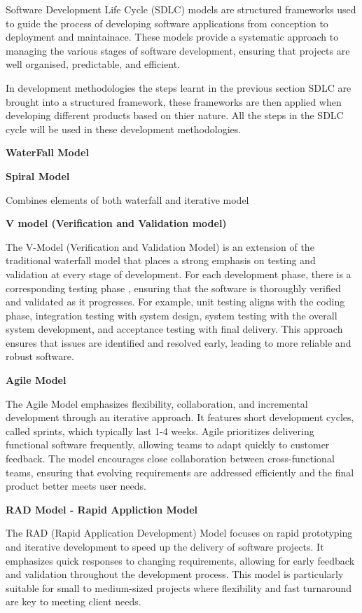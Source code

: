 \documentclass[a4paper]{article}
\begin{document}
Software Development Life Cycle (SDLC) models are structured frameworks used to guide the process of developing software applications from conception
to deployment and maintainace. These models provide a systematic approach to managing the various stages of software development, ensuring that 
projects are well organised, predictable, and efficient.

In development methodologies the steps learnt in the previous section SDLC are brought into a structured framework, these frameworks are then applied
when developing different products based on thier nature. All the steps in the SDLC cycle will be used in these development methodologies.

\textbf{WaterFall Model}



\textbf{Spiral Model}

Combines elements of both waterfall and iterative model 

\textbf{V model (Verification and Validation model)}

The V-Model (Verification and Validation Model) is an extension of the traditional waterfall model that places a strong emphasis on testing 
and validation at every stage of development. For each development phase, there is a corresponding testing phase ,
ensuring that the software is thoroughly verified and validated as it progresses. For example, unit testing aligns with the coding phase,
integration testing with system design, system testing with the overall system development, and acceptance testing with final delivery.
This approach ensures that issues are identified and resolved early, leading to more reliable and robust software.


\textbf{Agile Model}

The Agile Model emphasizes flexibility, collaboration, and incremental development through an iterative approach. 
It features short development cycles, called sprints, which typically last 1-4 weeks. Agile prioritizes delivering functional software frequently,
allowing teams to adapt quickly to customer feedback. The model encourages close collaboration between cross-functional teams,
ensuring that evolving requirements are addressed efficiently and the final product better meets user needs.

\textbf{RAD Model - Rapid Appliction Model}

The RAD (Rapid Application Development) Model focuses on rapid prototyping and iterative development to speed up the delivery of software projects.
It emphasizes quick responses to changing requirements, allowing for early feedback and validation throughout the development process.
This model is particularly suitable for small to medium-sized projects where flexibility and fast turnaround are key to meeting client needs.
    
\end{document}
